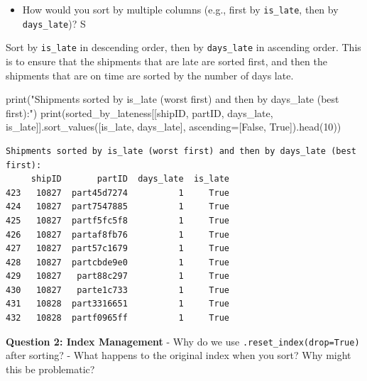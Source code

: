 \documentclass[
]{article}
\newenvironment{Shaded}{\begin{snugshade}}{\end{snugshade}}
\newcommand{\BuiltInTok}[1]{\textcolor[rgb]{0.00,0.23,0.31}{#1}}
\newcommand{\DecValTok}[1]{\textcolor[rgb]{0.68,0.00,0.00}{#1}}
\newcommand{\NormalTok}[1]{\textcolor[rgb]{0.00,0.23,0.31}{#1}}
\newcommand{\OperatorTok}[1]{\textcolor[rgb]{0.37,0.37,0.37}{#1}}
\newcommand{\StringTok}[1]{\textcolor[rgb]{0.13,0.47,0.30}{#1}}
\newcommand{\VariableTok}[1]{\textcolor[rgb]{0.07,0.07,0.07}{#1}}
\providecommand{\tightlist}{%
  \setlength{\itemsep}{0pt}\setlength{\parskip}{0pt}}
\begin{document}
\begin{itemize}
\tightlist
\item
  How would you sort by multiple columns (e.g., first by
  \texttt{is\_late}, then by \texttt{days\_late})? S
\end{itemize}

Sort by \texttt{is\_late} in descending order, then by
\texttt{days\_late} in ascending order. This is to ensure that the
shipments that are late are sorted first, and then the shipments that
are on time are sorted by the number of days late.

\label{sorting-strategies-2}
\begin{Shaded}
\begin{Highlighting}[]
\BuiltInTok{print}\NormalTok{(}\StringTok{"Shipments sorted by is\_late (worst first) and then by days\_late (best first):"}\NormalTok{)}
\BuiltInTok{print}\NormalTok{(sorted\_by\_lateness[[}\StringTok{\textquotesingle{}shipID\textquotesingle{}}\NormalTok{, }\StringTok{\textquotesingle{}partID\textquotesingle{}}\NormalTok{, }\StringTok{\textquotesingle{}days\_late\textquotesingle{}}\NormalTok{, }\StringTok{\textquotesingle{}is\_late\textquotesingle{}}\NormalTok{]].sort\_values([}\StringTok{\textquotesingle{}is\_late\textquotesingle{}}\NormalTok{, }\StringTok{\textquotesingle{}days\_late\textquotesingle{}}\NormalTok{], ascending}\OperatorTok{=}\NormalTok{[}\VariableTok{False}\NormalTok{, }\VariableTok{True}\NormalTok{]).head(}\DecValTok{10}\NormalTok{))}
\end{Highlighting}
\end{Shaded}

\begin{verbatim}
Shipments sorted by is_late (worst first) and then by days_late (best first):
     shipID       partID  days_late  is_late
423   10827  part45d7274          1     True
424   10827  part7547885          1     True
425   10827  partf5fc5f8          1     True
426   10827  partaf8fb76          1     True
427   10827  part57c1679          1     True
428   10827  partcbde9e0          1     True
429   10827   part88c297          1     True
430   10827   parte1c733          1     True
431   10828  part3316651          1     True
432   10828  partf0965ff          1     True
\end{verbatim}

\textbf{Question 2: Index Management} - Why do we use
\texttt{.reset\_index(drop=True)} after sorting? - What happens to the
original index when you sort? Why might this be problematic?
\end{document}
